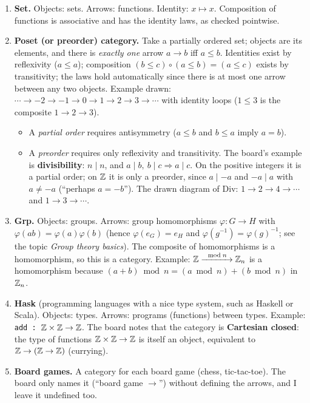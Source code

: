 \documentclass[11pt]{article}
\begin{document}
\begin{enumerate}
  \item \textbf{Set.} Objects: sets. Arrows: functions. Identity: $x\mapsto x$. Composition of functions is associative and has the identity laws, as checked pointwise.

  \item \textbf{Poset (or preorder) category.} Take a partially ordered set; objects are its elements, and there is \emph{exactly one} arrow $a\to b$ iff $a\le b$. Identities exist by reflexivity ($a\le a$); composition $(b\le c)\circ(a\le b)=(a\le c)$ exists by transitivity; the laws hold automatically since there is at most one arrow between any two objects. Example drawn: $\cdots\to-2\to-1\to0\to1\to2\to3\to\cdots$ with identity loops ($1\le3$ is the composite $1\to2\to3$).
  \begin{itemize}[nosep]
    \item A \emph{partial order} requires antisymmetry ($a\le b$ and $b\le a$ imply $a=b$).
    \item A \emph{preorder} requires only reflexivity and transitivity. The board's example is \textbf{divisibility}: $n\mid n$, and $a\mid b,\ b\mid c\Rightarrow a\mid c$. On the positive integers it is a partial order; on $\mathbb{Z}$ it is only a preorder, since $a\mid -a$ and $-a\mid a$ with $a\ne-a$ (``perhaps $a=-b$''). The drawn diagram of $\mathrm{Div}$: $1\to2\to4\to\cdots$ and $1\to3\to\cdots$.
  \end{itemize}

  \item \textbf{Grp.} Objects: groups. Arrows: group homomorphisms $\varphi:G\to H$ with $\varphi(ab)=\varphi(a)\varphi(b)$ (hence $\varphi(e_G)=e_H$ and $\varphi(g^{-1})=\varphi(g)^{-1}$; see the topic \emph{Group theory basics}). The composite of homomorphisms is a homomorphism, so this is a category. Example: $\mathbb{Z}\xrightarrow{\ \bmod n\ }\mathbb{Z}_n$ is a homomorphism because $(a+b)\bmod n=(a\bmod n)+(b\bmod n)$ in $\mathbb{Z}_n$.

  \item \textbf{Hask} (programming languages with a nice type system, such as Haskell or Scala). Objects: types. Arrows: programs (functions) between types. Example: \texttt{add : $\mathbb{Z}\times\mathbb{Z}\to\mathbb{Z}$}. The board notes that the category is \textbf{Cartesian closed}: the type of functions $\mathbb{Z}\times\mathbb{Z}\to\mathbb{Z}$ is itself an object, equivalent to $\mathbb{Z}\to(\mathbb{Z}\to\mathbb{Z})$ (currying).

  \item \textbf{Board games.} A category for each board game (chess, tic-tac-toe). The board only names it (``board game $\to$'') without defining the arrows, and I leave it undefined too.


\end{enumerate}
\end{document}

